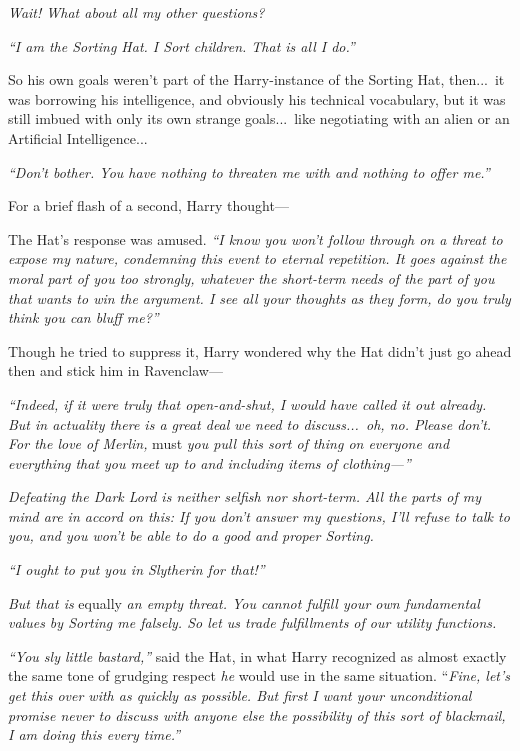 \emph{Wait! What about all my other questions?}

\emph{“I am the Sorting Hat. I Sort children. That is all I do.”}

So his own goals weren’t part of the Harry-instance of the Sorting Hat, then...\ it was borrowing his intelligence, and obviously his technical vocabulary, but it was still imbued with only its own strange goals...\ like negotiating with an alien or an Artificial Intelligence...

\emph{“Don’t bother. You have nothing to threaten me with and nothing to offer me.”}

For a brief flash of a second, Harry thought—

The Hat’s response was amused. \emph{“I know you won’t follow through on a threat to expose my nature, condemning this event to eternal repetition. It goes against the moral part of you too strongly, whatever the short-term needs of the part of you that wants to win the argument. I see all your thoughts as they form, do you truly think you can bluff me?”}

Though he tried to suppress it, Harry wondered why the Hat didn’t just go ahead then and stick him in Ravenclaw—

\emph{“Indeed, if it were truly that open-and-shut, I would have called it out already. But in actuality there is a great deal we need to discuss...\ oh, no. Please don’t. For the love of Merlin,} must \emph{you pull this sort of thing on everyone and everything that you meet up to and including items of clothing—”}

\emph{Defeating the Dark Lord is neither selfish nor short-term. All the parts of my mind are in accord on this: If you don’t answer my questions, I’ll refuse to talk to you, and you won’t be able to do a good and proper Sorting.}

\emph{“I ought to put you in Slytherin for that!”}

\emph{But that is} equally \emph{an empty threat. You cannot fulfill your own fundamental values by Sorting me falsely. So let us trade fulfillments of our utility functions.}

\emph{“You sly little bastard,”} said the Hat, in what Harry recognized as almost exactly the same tone of grudging respect \emph{he} would use in the same situation. “\emph{Fine, let’s get this over with as quickly as possible. But first I want your unconditional promise never to discuss with anyone else the possibility of this sort of blackmail, I am  doing this every time.”}

